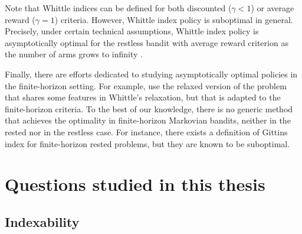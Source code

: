 Note that Whittle indices can be defined for both discounted ($\gamma<1$) or average reward ($\gamma=1$) criteria.
However, Whittle index policy is suboptimal in general.
Precisely, under certain technical assumptions, Whittle index policy is asymptotically optimal for the restless bandit with average reward criterion as the number of arms grows to infinity \cite{weber1990index}.

Finally, there are efforts dedicated to studying asymptotically optimal policies in the finite-horizon setting.
For example, \cite{hu2017asymptotically,brown2020index,zhang2021restless,gastGaujalYan-lpbased} use the relaxed version of the problem that shares some features in Whittle's relaxation, but that is adapted to the finite-horizon criteria.
To the best of our knowledge, there is no generic method that achieves the optimality in finite-horizon Markovian bandits, neither in the rested nor in the restless case.
For instance, there exists a definition of Gittins index for finite-horizon rested problems, but they are known to be suboptimal. 



\section{Questions studied in this thesis}
\label{ch:mb:sec:studied}

\subsection{Indexability}

